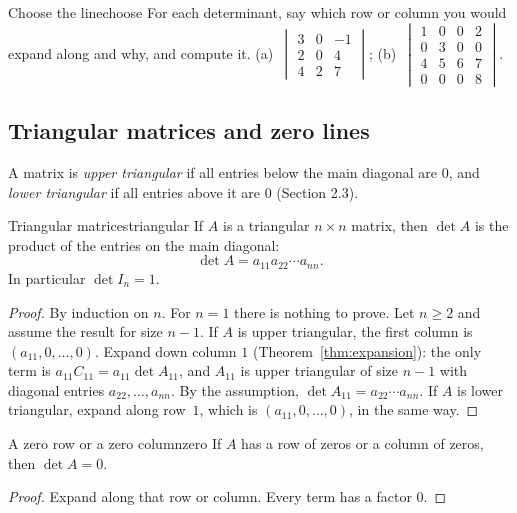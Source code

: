 \documentclass[11pt]{article}
\begin{document}
\begin{kc}{Choose the line}{choose}
For each determinant, say which row or column you would expand along and why, and compute it. (a)~$\begin{vmatrix}3&0&-1\\2&0&4\\4&2&7\end{vmatrix}$; \quad (b)~$\begin{vmatrix}1&0&0&2\\0&3&0&0\\4&5&6&7\\0&0&0&8\end{vmatrix}$.
\end{kc}

\subsection*{Triangular matrices and zero lines}

A matrix is \emph{upper triangular} if all entries below the main diagonal are $0$, and \emph{lower triangular} if all entries above it are $0$ (Section 2.3).

\begin{thm}{Triangular matrices}{triangular}
If $A$ is a triangular $n\times n$ matrix, then $\det A$ is the product of the entries on the main diagonal:
\[
\det A=a_{11}a_{22}\cdots a_{nn}.
\]
In particular $\det I_n=1$.
\end{thm}

\begin{proof}
By induction on $n$. For $n=1$ there is nothing to prove. Let $n\geq2$ and assume the result for size $n-1$. If $A$ is upper triangular, the first column is $(a_{11},0,\dots,0)$. Expand down column $1$ (Theorem~\ref{thm:expansion}): the only term is $a_{11}C_{11}=a_{11}\det A_{11}$, and $A_{11}$ is upper triangular of size $n-1$ with diagonal entries $a_{22},\dots,a_{nn}$. By the assumption, $\det A_{11}=a_{22}\cdots a_{nn}$. If $A$ is lower triangular, expand along row~$1$, which is $(a_{11},0,\dots,0)$, in the same way.
\end{proof}

\begin{thm}{A zero row or a zero column}{zero}
If $A$ has a row of zeros or a column of zeros, then $\det A=0$.
\end{thm}

\begin{proof}
Expand along that row or column. Every term has a factor $0$.
\end{proof}
\end{document}
